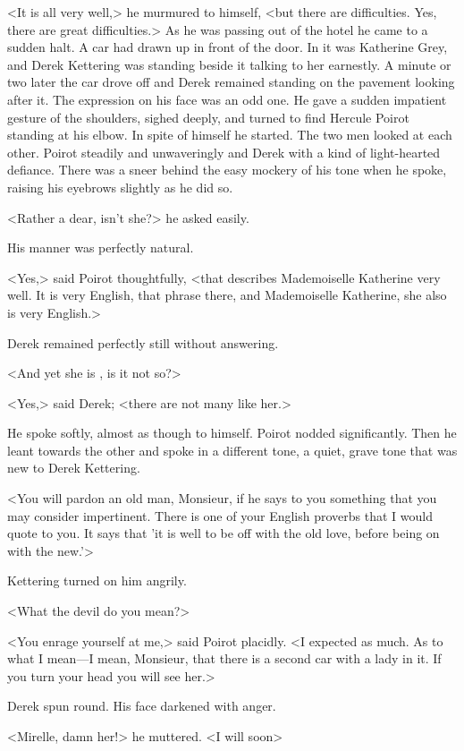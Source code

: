 <It is all very well,> he murmured to himself, <but there are difficulties. Yes, there are great difficulties.> As he was passing out of the hotel he came to a sudden halt. A car had drawn up in front of the door. In it was Katherine Grey, and Derek Kettering was standing beside it talking to her earnestly. A minute or two later the car drove off and Derek remained standing on the pavement looking after it. The expression on his face was an odd one. He gave a sudden impatient gesture of the shoulders, sighed deeply, and turned to find Hercule Poirot standing at his elbow. In spite of himself he started. The two men looked at each other. Poirot steadily and unwaveringly and Derek with a kind of light-hearted defiance. There was a sneer behind the easy mockery of his tone when he spoke, raising his eyebrows slightly as he did so.

<Rather a dear, isn't she?> he asked easily.

His manner was perfectly natural.

<Yes,> said Poirot thoughtfully, <that describes Mademoiselle Katherine very well. It is very English, that phrase there, and Mademoiselle Katherine, she also is very English.>

Derek remained perfectly still without answering.

<And yet she is , is it not so?>

<Yes,> said Derek; <there are not many like her.>

He spoke softly, almost as though to himself. Poirot nodded significantly. Then he leant towards the other and spoke in a different tone, a quiet, grave tone that was new to Derek Kettering.

<You will pardon an old man, Monsieur, if he says to you something that you may consider impertinent. There is one of your English proverbs that I would quote to you. It says that 'it is well to be off with the old love, before being on with the new.'>

Kettering turned on him angrily.

<What the devil do you mean?>

<You enrage yourself at me,> said Poirot placidly. <I expected as much. As to what I mean—I mean, Monsieur, that there is a second car with a lady in it. If you turn your head you will see her.>

Derek spun round. His face darkened with anger.

<Mirelle, damn her!> he muttered. <I will soon\longdash>

